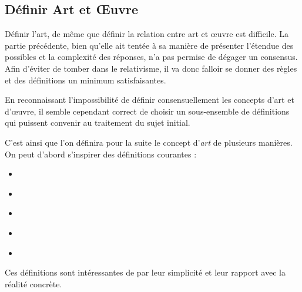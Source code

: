 \documentclass[12pt]{article} %
\begin{document}
\subsection{Définir Art et Œuvre}
Définir l'art, de même que définir la relation entre art et œuvre est difficile. La partie précédente, bien qu'elle ait tentée à sa manière de présenter l'étendue des possibles et la complexité des réponses, n'a pas permise de dégager un consensus. Afin d'éviter de tomber dans le relativisme, il va donc falloir se donner des règles et des définitions un minimum satisfaisantes. 

En reconnaissant l'impossibilité de définir consensuellement les concepts d'art et d'œuvre, il semble cependant correct de choisir un sous-ensemble de définitions qui puissent convenir au traitement du sujet initial.


C'est ainsi que l'on définira pour la suite le concept d'\textit{art} de plusieurs manières. On peut d'abord s'inspirer des définitions courantes :
\begin{itemize}
    \item {} \cite{WiktionnaireFr-art}
    \item {} \cite{WiktionnaireFr-art}
    \item {} \cite{LarousseOnline-art}
    \item {} \cite{LarousseOnline-art}
    \item {} \cite{LarousseOnline-art}
\end{itemize}
Ces définitions sont intéressantes de par leur simplicité et leur rapport avec la réalité concrète. 
\end{document}
